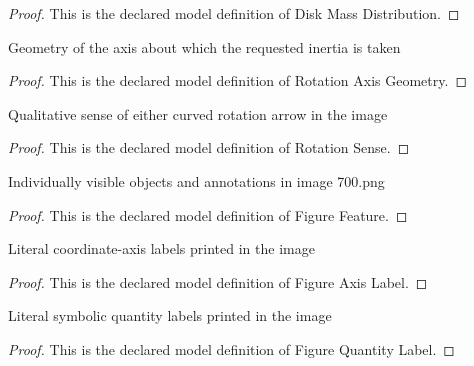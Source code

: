 \begin{proof}
  This is the declared model definition of Disk Mass Distribution.
\end{proof}
\begin{definition}
  \label{def:physics:phyx-mini-0700:phyxminiproblems-problemphyxmini0700-rotationaxisgeometry}
  Geometry of the axis about which the requested inertia is taken
\end{definition}
\begin{proof}
  This is the declared model definition of Rotation Axis Geometry.
\end{proof}
\begin{definition}
  \label{def:physics:phyx-mini-0700:phyxminiproblems-problemphyxmini0700-rotationsense}
  Qualitative sense of either curved rotation arrow in the image
\end{definition}
\begin{proof}
  This is the declared model definition of Rotation Sense.
\end{proof}
\begin{definition}
  \label{def:physics:phyx-mini-0700:phyxminiproblems-problemphyxmini0700-figurefeature}
  Individually visible objects and annotations in image 700.png
\end{definition}
\begin{proof}
  This is the declared model definition of Figure Feature.
\end{proof}
\begin{definition}
  \label{def:physics:phyx-mini-0700:phyxminiproblems-problemphyxmini0700-figureaxislabel}
  Literal coordinate-axis labels printed in the image
\end{definition}
\begin{proof}
  This is the declared model definition of Figure Axis Label.
\end{proof}
\begin{definition}
  \label{def:physics:phyx-mini-0700:phyxminiproblems-problemphyxmini0700-figurequantitylabel}
  Literal symbolic quantity labels printed in the image
\end{definition}
\begin{proof}
  This is the declared model definition of Figure Quantity Label.
\end{proof}
